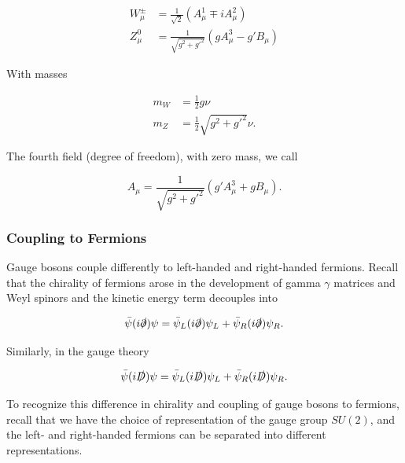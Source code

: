 \documentclass[10pt]{article}
\begin{document}
\begin{align}
W_\mu^\pm &= \frac{1}{\sqrt{2}} \left( A_\mu^1 \mp i A_\mu^2 \right) \\
Z_\mu^0 &= \frac{1}{\sqrt{g^2 + g'^2}} \left( g A_\mu^3 - g' B_\mu \right)
\end{align}

\noindent With masses

\begin{align}
m_W &= \frac{1}{2} g \nu \\
m_Z &= \frac{1}{2} \sqrt{g^2 + g'^2} \nu.
\end{align}

\noindent The fourth field (degree of freedom), with zero mass, we call

\begin{equation}
A_\mu = \frac{1}{\sqrt{g^2 + g'^2}} (g' A_\mu^3 + g B_\mu ).
\end{equation}

\subsubsection*{Coupling to Fermions}

\noindent Gauge bosons couple differently to left-handed and right-handed fermions. Recall that the chirality of fermions arose in the development of gamma $\gamma$ matrices and Weyl spinors and the kinetic energy term decouples into

\begin{equation}
\bar{\psi} (i \slashed{\partial}) \psi = \bar{\psi}_L (i \slashed{\partial}) \psi_L + \bar{\psi}_R (i \slashed{\partial}) \psi_R.
\end{equation}

\noindent Similarly, in the gauge theory

\begin{equation}
\bar{\psi} (i \slashed{D}) \psi = \bar{\psi}_L (i \slashed{D}) \psi_L + \bar{\psi}_R (i \slashed{D}) \psi_R.
\end{equation}

\noindent To recognize this difference in chirality and coupling of gauge bosons to fermions, recall that we have the choice of representation of the gauge group $SU(2)$, and the left- and right-handed fermions can be separated into different representations. \\

%

\end{document}
